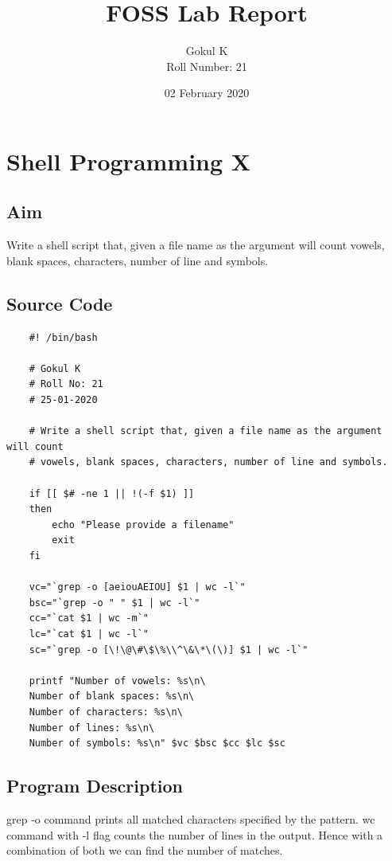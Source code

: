 \documentclass{article}
\begin{document}
\title{FOSS Lab Report}
\author{Gokul K\\[2\baselineskip]
Roll Number: 21\\[2\baselineskip]}
\date{02 February 2020}

\maketitle

\setcounter{section}{13}
\section{Shell Programming X}
\subsection{Aim}
Write a shell script that, given a file name as the argument will count
vowels, blank spaces, characters, number of line and symbols.

\subsection{Source Code}
\begin{verbatim}
    #! /bin/bash

    # Gokul K
    # Roll No: 21
    # 25-01-2020

    # Write a shell script that, given a file name as the argument will count
    # vowels, blank spaces, characters, number of line and symbols.

    if [[ $# -ne 1 || !(-f $1) ]]
    then
        echo "Please provide a filename"
        exit
    fi

    vc="`grep -o [aeiouAEIOU] $1 | wc -l`"
    bsc="`grep -o " " $1 | wc -l`"
    cc="`cat $1 | wc -m`"
    lc="`cat $1 | wc -l`"
    sc="`grep -o [\!\@\#\$\%\\^\&\*\(\)] $1 | wc -l`"

    printf "Number of vowels: %s\n\
    Number of blank spaces: %s\n\
    Number of characters: %s\n\
    Number of lines: %s\n\
    Number of symbols: %s\n" $vc $bsc $cc $lc $sc
\end{verbatim}

\subsection{Program Description}
grep -o command prints all matched characters specified by the pattern.
wc command with -l flag counts the number of lines in the output. Hence with a
combination of both we can find the number of matches.
\end{document}
